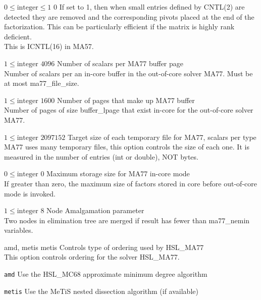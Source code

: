 %
{$0\leq\textrm{integer}\leq1$}%
{$0$}%
{If set to 1, then when small entries defined by CNTL(2) are detected they are removed and the corresponding pivots placed at the end of the factorization.  This can be particularly efficient if the matrix is highly rank deficient.\\
This is ICNTL(16) in MA57.}%
{}

%
{$1\leq\textrm{integer}$}%
{$4096$}%
{Number of scalars per MA77 buffer page\\
Number of scalars per an in-core buffer in the out-of-core solver MA77. Must be at most ma77\_file\_size.}%
{}

%
{$1\leq\textrm{integer}$}%
{$1600$}%
{Number of pages that make up MA77 buffer\\
Number of pages of size buffer\_lpage that exist in-core for the out-of-core solver MA77.}%
{}

%
{$1\leq\textrm{integer}$}%
{$2097152$}%
{Target size of each temporary file for MA77, scalars per type\\
MA77 uses many temporary files, this option controls the size of each one. It is measured in the number of entries (int or double), NOT bytes.}%
{}

%
{$0\leq\textrm{integer}$}%
{$0$}%
{Maximum storage size for MA77 in-core mode\\
If greater than zero, the maximum size of factors stored in core before out-of-core mode is invoked.}%
{}

%
{$1\leq\textrm{integer}$}%
{$8$}%
{Node Amalgamation parameter\\
Two nodes in elimination tree are merged if result has fewer than ma77\_nemin variables.}%
{}

%
{\ttfamily amd, metis}%
{metis}%
{Controls type of ordering used by HSL\_MA77\\
This option controls ordering for the solver HSL\_MA77.}%
{\begin{list}{}{
\setlength{\parsep}{0em}
\setlength{\leftmargin}{5ex}
\setlength{\labelwidth}{2ex}
\setlength{\itemindent}{0ex}
\setlength{\topsep}{0pt}}
\item[\texttt{amd}] Use the HSL\_MC68 approximate minimum degree algorithm
\item[\texttt{metis}] Use the MeTiS nested dissection algorithm (if available)
\end{list}
}

